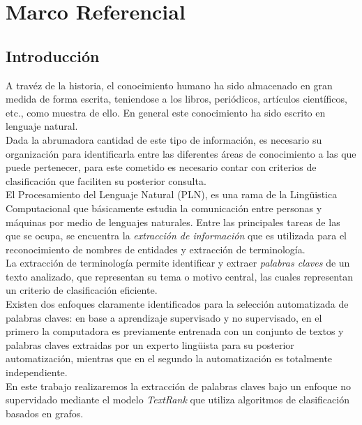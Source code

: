 \chapter{Marco Referencial}
\section{Introducci\'on}
A trav\'ez de la historia, el conocimiento humano ha sido almacenado en gran medida
de forma escrita, teniendose a los libros, peri\'odicos, art\'iculos cient\'ificos,
etc., como muestra de ello. En general este conocimiento ha sido escrito en lenguaje
natural. \\

Dada la abrumadora cantidad de este tipo de informaci\'on, es necesario su 
organizaci\'on para identificarla entre las diferentes \'areas de conocimiento 
a las que puede pertenecer, para este cometido es necesario contar con criterios 
de clasificaci\'on que faciliten su posterior consulta. \\

El Procesamiento del Lenguaje Natural (PLN), es una rama de la Ling\"uistica 
Computacional que b\'asicamente estudia la comunicaci\'on entre personas y 
m\'aquinas por medio de lenguajes naturales. Entre las principales tareas de las que 
se ocupa, se encuentra la \emph{extracci\'on de informaci\'on} que es utilizada 
para el reconocimiento de nombres de entidades y extracci\'on de terminolog\'ia. \\

La extracci\'on de terminolog\'ia permite identificar y extraer \emph{palabras claves} 
de un texto analizado, que representan su tema o motivo central, las cuales 
representan un criterio de clasificaci\'on eficiente.\\

Existen dos enfoques claramente identificados para la selecci\'on automatizada
de palabras claves: en base a aprendizaje supervisado y no supervisado, en el primero 
la computadora es previamente entrenada con un conjunto de textos y palabras 
claves extraidas por un experto ling\"uista para su posterior automatizaci\'on, 
mientras que en el segundo la automatizaci\'on es totalmente independiente.\\

En este trabajo realizaremos la extracci\'on de palabras claves bajo un enfoque no
supervidado mediante el modelo \emph{TextRank} que utiliza algoritmos de 
clasificaci\'on basados en grafos.\\

